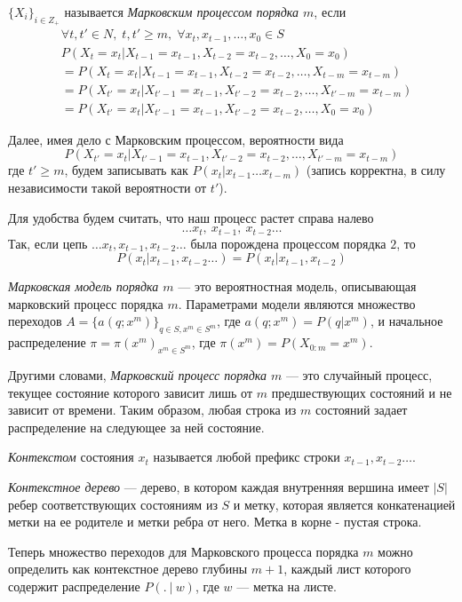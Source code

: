 \documentclass{matmex-diploma-custom}
\begin{document}
\begin{definition} $ \{X_{i}\}_{i \in Z_{+}}$ называется \emph{Марковским процессом порядка $ m $}, если  
\begin{align*}
&\forall t, t'\in N, \;t, t' \geq m,\; \forall x_{t},x_{t-1},\ldots ,x_{0}\in S
\\&P(X_{t} = x_{t}|X_{t-1}=x_{t-1},X_{t-2}=x_{t-2}, \ldots ,X_{0}=x_{0}) 
\\&=P(X_{t} = x_{t}|X_{t-1}=x_{t-1},X_{t-2}=x_{t-2}, \ldots ,X_{t-m}=x_{t-m})
\\&=P(X_{t'} = x_{t}|X_{t'-1}=x_{t-1},X_{t'-2}=x_{t-2}, \ldots ,X_{t'-m}=x_{t-m})
\\&=P(X_{t'} = x_{t}|X_{t'-1}=x_{t-1},X_{t'-2}=x_{t-2}, \ldots ,X_{0}=x_{0}) 
\end{align*}
\label{MP}
\end{definition}
Далее, имея дело с Марковским процессом, вероятности вида  
$$P(X_{t'} = x_{t}|X_{t'-1}=x_{t-1},X_{t'-2}=x_{t-2}, \ldots ,X_{t'-m}=x_{t-m})$$ где $t'\geq m$, будем записывать как $P(x_{t} |x_{t-1}\ldots x_{t-m})$ (запись корректна, в силу независимости такой вероятности от $t'$).

Для удобства будем считать, что наш процесс растет справа налево  
$$\ldots x_{t},~ x_{t-1},~ x_{t-2} \ldots$$
Так,  если цепь $\ldots x_{t}, x_{t-1}, x_{t-2} \ldots$ была порождена процессом порядка $2$,
то $$P(x_{t}| x_{t-1},x_{t-2}\ldots) = P(x_{t}|x_{t-1},x_{t-2})$$

\begin{definition} \emph{Марковская модель порядка $ m $} --- это вероятностная модель, описывающая марковский процесс порядка $m$. Параметрами модели являются множество переходов  $ A = \{a(q; x^{m})\}_{q \in S, x^{m} \in S^{m}}$, где $a(q; x^{m}) = P(q|x^{m})$, и начальное распределение $\pi = \pi(x^m)_{x^m \in S^m}$, где $\pi(x^m) = P(X_{0:m}=x^m)$.
\end{definition}

Другими словами, \textit{Марковский процесс порядка $m$} --- это случайный процесс, текущее состояние которого зависит лишь от $m$ предшествующих состояний и не зависит от времени. Таким образом, любая строка из $m$ состояний задает распределение на следующее за ней состояние. 

\textit{Контекстом} состояния $ x_{t} $  называется любой префикс строки  $x_{t-1}, x_{t-2} \ldots$. 

\begin{definition}
\textit{Контекстное дерево} --- дерево, в котором каждая внутренняя вершина имеет $ |S| $ ребер соответствующих состояниям из $S$ и метку, которая является конкатенацией метки на ее родителе и метки ребра от него. Метка в корне - пустая строка.
\end{definition}
Теперь множество переходов для Марковского процесса порядка $ m $ можно определить как контекстное дерево глубины $ m+1 $, каждый лист которого содержит распределение $P(.~|~w)$, где $ w $ --- метка на листе.
\end{document}
